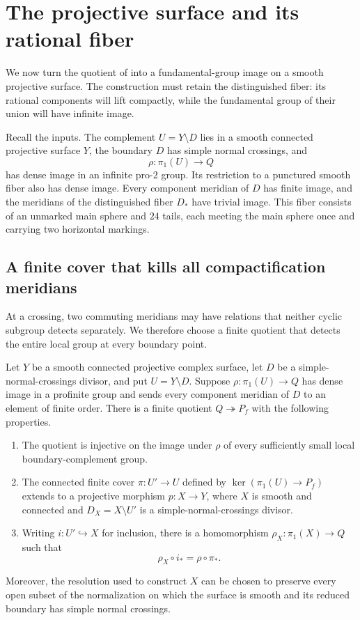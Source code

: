 \section{The projective surface and its rational fiber}
\label{sec:surface}

We now turn the quotient of  into a
fundamental-group image on a smooth projective surface.  The construction
must retain the distinguished fiber: its rational components will lift
compactly, while the fundamental group of their union will have infinite
image.

Recall the inputs.  The complement $U=Y\setminus D$ lies in a smooth
connected projective surface $Y$, the boundary $D$ has simple normal
crossings, and
\[
  \rho:\pi_1(U)\longrightarrow Q
\]
has dense image in an infinite pro-$2$ group.  Its restriction to a
punctured smooth fiber also has dense image.  Every component meridian of
$D$ has finite image, and the meridians of the distinguished fiber
$D_*$ have trivial image.  This fiber consists of an unmarked main
sphere and $24$ tails, each meeting the main sphere once and carrying
two horizontal markings.

\subsection{A finite cover that kills all compactification meridians}

At a crossing, two commuting meridians may have relations that neither
cyclic subgroup detects separately.  We therefore choose a finite
quotient that detects the entire local group at every boundary point.

\begin{lemma}
\label{lem:local-detection}
Let $Y$ be a smooth connected projective complex surface, let $D$ be a
simple-normal-crossings divisor, and put $U=Y\setminus D$.  Suppose
$\rho:\pi_1(U)\to Q$ has dense image in a profinite group and sends
every component meridian of $D$ to an element of finite order.
There is a finite quotient $Q\twoheadrightarrow P_f$ with the following
properties.
\begin{enumerate}
  \item The quotient is injective on the image under $\rho$ of every
  sufficiently small local boundary-complement group.
  \item The connected finite cover
  $\pi:U'\to U$ defined by
  $\ker(\pi_1(U)\to P_f)$ extends to a projective morphism
  $p:X\to Y$, where $X$ is smooth and connected and
  $D_X=X\setminus U'$ is a simple-normal-crossings divisor.
  \item Writing $i:U'\hookrightarrow X$ for inclusion, there is a
  homomorphism $\rho_X:\pi_1(X)\to Q$ such that
  \begin{equation}
    \rho_X\circ i_* = \rho\circ\pi_*.
    \label{eq:rho-descent}
  \end{equation}
\end{enumerate}
Moreover, the resolution used to construct $X$ can be chosen to preserve
every open subset of the normalization on which the surface is smooth
and its reduced boundary has simple normal crossings.
\end{lemma}

